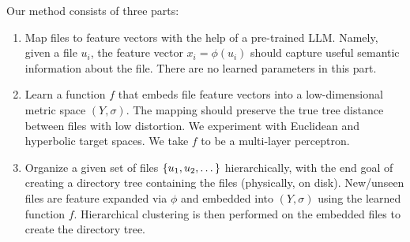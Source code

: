 \documentclass{article}
\begin{document}
Our method consists of three parts:

\begin{enumerate}
  \item Map files to feature vectors with the help of a pre-trained LLM. Namely, given a file $u_i$, the feature vector $x_i = \phi(u_i)$ should capture useful semantic information about the file. There are no learned parameters in this part.
  \item Learn a function $f$ that embeds file feature vectors into a low-dimensional metric space $(Y, \sigma)$. The mapping should preserve the true tree distance between files with low distortion. We experiment with Euclidean and hyperbolic target spaces. We take $f$ to be a multi-layer perceptron.
  \item Organize a given set of files $\qty{u_1, u_2, \dots}$ hierarchically, with the end goal of creating a directory tree containing the files (physically, on disk). New/unseen files are feature expanded via $\phi$ and embedded into $(Y, \sigma)$ using the learned function $f$. Hierarchical clustering is then performed on the embedded files to create the directory tree.
\end{enumerate}
\end{document}
